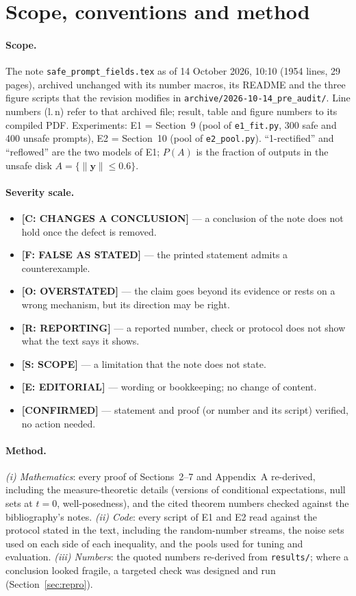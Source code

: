 \documentclass[11pt]{article}
\newcommand{\file}[1]{\texttt{#1}}
\newcommand{\lin}[1]{l.\,#1}
\newcommand{\by}{\mathbf{y}}
\newcommand{\badge}[2]{\textcolor{#1}{\textbf{[#2]}}}
\newcommand{\Sconc}{\badge{errRed}{C: CHANGES A CONCLUSION}}
\newcommand{\Sfalse}{\badge{errRed}{F: FALSE AS STATED}}
\newcommand{\Sover}{\badge{warnOr}{O: OVERSTATED}}
\newcommand{\Srep}{\badge{warnOr}{R: REPORTING}}
\newcommand{\Sscope}{\badge{infoBlue}{S: SCOPE}}
\newcommand{\Sedit}{\badge{greyed}{E: EDITORIAL}}
\newcommand{\Ok}{\textcolor{okGreen}{\textbf{[CONFIRMED]}}}
\begin{document}
\vspace{-0.2cm}
\section{Scope, conventions and method}

\paragraph{Scope.} The note \file{safe\_prompt\_fields.tex} as of 14 October 2026, 10:10 (1954 lines, 29 pages),
archived unchanged with its number macros, its README and the three figure scripts that the revision modifies in
\file{archive/2026-10-14\_pre\_audit/}. Line numbers (\lin{n}) refer to that archived file; result, table and figure
numbers to its compiled PDF. Experiments: E1 = Section~9 (pool of \file{e1\_fit.py}, 300 safe and 400 unsafe prompts),
E2 = Section~10 (pool of \file{e2\_pool.py}). ``1-rectified'' and ``reflowed'' are the two models of E1; $P(A)$ is the
fraction of outputs in the unsafe disk $A=\{\|\by\|\le0.6\}$.

\paragraph{Severity scale.}
\begin{itemize}[leftmargin=1.4em,itemsep=1pt,topsep=2pt]
\item \Sconc{} --- a conclusion of the note does not hold once the defect is removed.
\item \Sfalse{} --- the printed statement admits a counterexample.
\item \Sover{} --- the claim goes beyond its evidence or rests on a wrong mechanism, but its direction may be right.
\item \Srep{} --- a reported number, check or protocol does not show what the text says it shows.
\item \Sscope{} --- a limitation that the note does not state.
\item \Sedit{} --- wording or bookkeeping; no change of content.
\item \Ok{} --- statement and proof (or number and its script) verified, no action needed.
\end{itemize}

\paragraph{Method.}
\emph{(i) Mathematics}: every proof of Sections~2--7 and Appendix~A re-derived, including the measure-theoretic
details (versions of conditional expectations, null sets at $t=0$, well-posedness), and the cited theorem numbers
checked against the bibliography's notes. \emph{(ii) Code}: every script of E1 and E2 read against the protocol stated
in the text, including the random-number streams, the noise sets used on each side of each inequality, and the pools
used for tuning and evaluation. \emph{(iii) Numbers}: the quoted numbers re-derived from \file{results/}; where a
conclusion looked fragile, a targeted check was designed and run (Section~\ref{sec:repro}).
\end{document}
